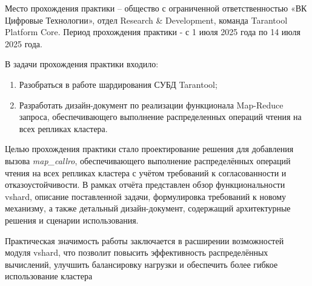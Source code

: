 \introduction

Место прохождения практики – общество с ограниченной ответственностью «ВК
Цифровые Технологии», отдел Research \& Development, команда Tarantool Platform
Core. Период прохождения практики - с 1 июля 2025 года по 14 июля 2025 года.

В задачи прохождения практики входило:

\begin{enumerate}
    \item Разобраться в работе шардирования СУБД Tarantool;
    \item Разработать дизайн-документ по реализации функционала Map-Reduce
          запроса, обеспечивающего выполнение распределенных операций чтения на
          всех репликах кластера.
\end{enumerate}

Целью прохождения практики стало проектирование решения для добавления вызова
\textit{map_callro}, обеспечивающего выполнение распределённых операций чтения
на всех репликах кластера с учётом требований к согласованности и
отказоустойчивости. В рамках отчёта представлен обзор функциональности vshard,
описание поставленной задачи, формулировка требований к новому механизму, а
также детальный дизайн-документ, содержащий архитектурные решения и сценарии
использования.

Практическая значимость работы заключается в расширении возможностей модуля
vshard, что позволит повысить эффективность распределённых вычислений, улучшить
балансировку нагрузки и обеспечить более гибкое использование кластера
